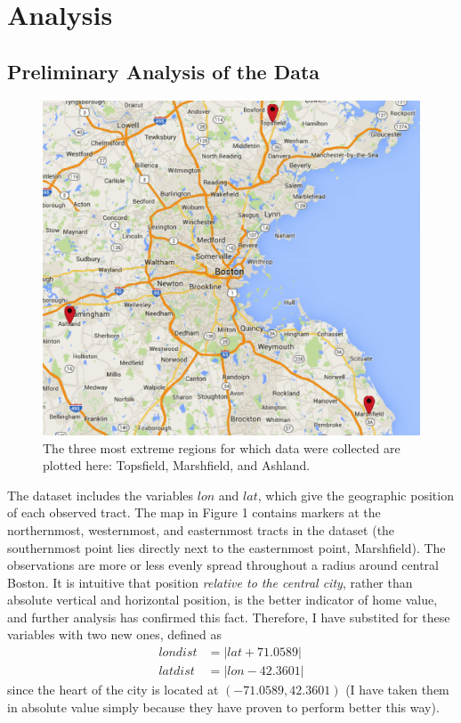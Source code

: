 \documentclass[12pt]{article}
\begin{document}
\section{Analysis}

\subsection{Preliminary Analysis of the Data}

\begin{figure}[ht!]
\centering
\includegraphics[width=120mm]{map.png}
\caption{The three most extreme regions for which data were collected are plotted here: Topsfield, Marshfield, and Ashland.}
\end{figure}

The dataset includes the variables $lon$ and $lat$, which give the geographic position of each observed tract.  The map in Figure 1 contains markers at the northernmost, westernmost, and easternmost tracts in the dataset (the southernmost point lies directly next to the easternmost point, Marshfield).  The observations are more or less evenly spread throughout a radius around central Boston.  It is intuitive that position \emph{relative to the central city}, rather than absolute vertical and horizontal position, is the better indicator of home value, and further analysis has confirmed this fact.  Therefore, I have substited for these variables with two new ones, defined as
\begin{align*}
londist &= |lat + 71.0589| \\
latdist &= |lon - 42.3601|
\end{align*}
since the heart of the city is located at $(-71.0589,42.3601)$ (I have taken them in absolute value simply because they have proven to perform better this way).
\end{document}
